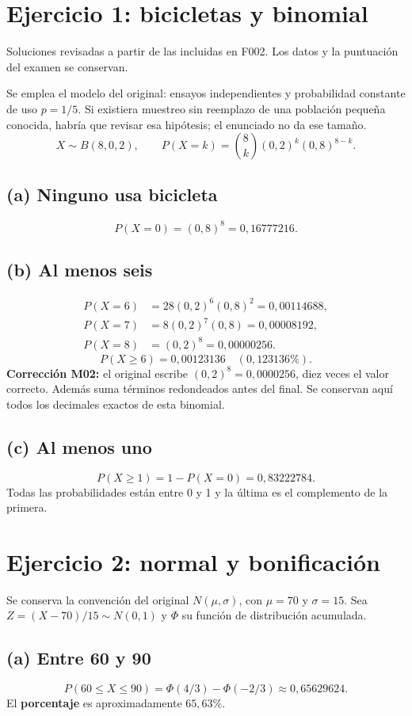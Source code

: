 \documentclass[11pt]{article}
\begin{document}
\section*{Ejercicio 1: bicicletas y binomial}
Soluciones revisadas a partir de las incluidas en F002. Los datos y la puntuación del examen se conservan.

Se emplea el modelo del original: ensayos independientes y probabilidad constante de uso $p=1/5$. Si existiera muestreo sin reemplazo de una población pequeña conocida, habría que revisar esa hipótesis; el enunciado no da ese tamaño.
\[X\sim B(8,0{,}2),\qquad P(X=k)=\binom8k(0{,}2)^k(0{,}8)^{8-k}.\]
\subsection*{(a) Ninguno usa bicicleta}
\[P(X=0)=(0{,}8)^8=\boxed{0{,}16777216}.\]
\subsection*{(b) Al menos seis}
\begin{align*}
P(X=6)&=28(0{,}2)^6(0{,}8)^2=0{,}00114688,\\
P(X=7)&=8(0{,}2)^7(0{,}8)=0{,}00008192,\\
P(X=8)&=(0{,}2)^8=0{,}00000256.
\end{align*}
\[\boxed{P(X\geq6)=0{,}00123136}\quad(0{,}123136\%).\]
\textbf{Corrección M02:} el original escribe $(0{,}2)^8=0{,}0000256$, diez veces el valor correcto. Además suma términos redondeados antes del final. Se conservan aquí todos los decimales exactos de esta binomial.
\subsection*{(c) Al menos uno}
\[P(X\geq1)=1-P(X=0)=\boxed{0{,}83222784}.\]
Todas las probabilidades están entre 0 y 1 y la última es el complemento de la primera.
\clearpage
\section*{Ejercicio 2: normal y bonificación}
Se conserva la convención del original $N(\mu,\sigma)$, con $\mu=70$ y $\sigma=15$. Sea $Z=(X-70)/15\sim N(0,1)$ y $\Phi$ su función de distribución acumulada.
\subsection*{(a) Entre 60 y 90}
\[
P(60\leq X\leq90)=\Phi(4/3)-\Phi(-2/3)\approx0{,}65629624.
\]
El \textbf{porcentaje} es aproximadamente $\boxed{65{,}63\%}$.
\end{document}
